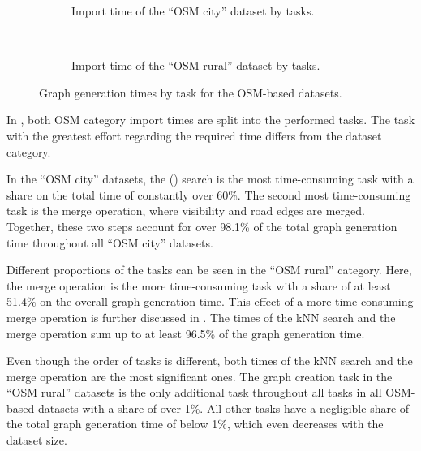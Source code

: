 			\begin{figure}[h!]
				\begin{figcenter}
					\begin{subfigure}[t]{\textwidth}
						\begin{figcenter}
							
						\end{figcenter}
						\caption{Import time of the \enquote{OSM city} dataset by tasks.}
					\end{subfigure}
					\\[3ex]
					\begin{subfigure}[t]{\textwidth}
						\begin{figcenter}
							
						\end{figcenter}
						\caption{Import time of the \enquote{OSM rural} dataset by tasks.}
					\end{subfigure}
				\end{figcenter}
				\caption{Graph generation times by task for the OSM-based datasets.}
				\label{fig:eval-import-details}
			\end{figure}
			
			In , both OSM category import times are split into the performed tasks.
			The task with the greatest effort regarding the required time differs from the dataset category.
			
			In the \enquote{OSM city} datasets, the  () search is the most time-consuming task with a share on the total time of constantly over 60\%.
			The second most time-consuming task is the merge operation, where visibility and road edges are merged.
			Together, these two steps account for over 98.1\% of the total graph generation time throughout all \enquote{OSM city} datasets.
			
			Different proportions of the tasks can be seen in the \enquote{OSM rural} category.
			Here, the merge operation is the more time-consuming task with a share of at least 51.4\% on the overall graph generation time.
			This effect of a more time-consuming merge operation is further discussed in .
			The times of the kNN search and the merge operation sum up to at least 96.5\% of the graph generation time.
			
			Even though the order of tasks is different, both times of the kNN search and the merge operation are the most significant ones.
			The graph creation task in the \enquote{OSM rural} datasets is the only additional task throughout all tasks in all OSM-based datasets with a share of over 1\%.
			All other tasks have a negligible share of the total graph generation time of below 1\%, which even decreases with the dataset size.
	
